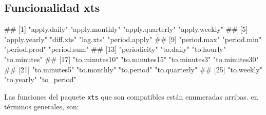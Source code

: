 \documentclass[
]{book}
\newenvironment{Shaded}{\begin{snugshade}}{\end{snugshade}}
\newcommand{\FunctionTok}[1]{\textcolor[rgb]{0.13,0.29,0.53}{\textbf{#1}}}
\newcommand{\NormalTok}[1]{#1}
\newcommand{\SpecialCharTok}[1]{\textcolor[rgb]{0.81,0.36,0.00}{\textbf{#1}}}
\begin{document}
\hypertarget{funcionalidad-xts}{%
\subsection{Funcionalidad xts}\label{funcionalidad-xts}}

\begin{Shaded}
\end{Shaded}

\begin{Shaded}
\begin{Highlighting}[]
\NormalTok{\#\#  [1] "apply.daily"     "apply.monthly"   "apply.quarterly" "apply.weekly"   }
\NormalTok{\#\#  [5] "apply.yearly"    "diff.xts"        "lag.xts"         "period.apply"   }
\NormalTok{\#\#  [9] "period.max"      "period.min"      "period.prod"     "period.sum"     }
\NormalTok{\#\# [13] "periodicity"     "to.daily"        "to.hourly"       "to.minutes"     }
\NormalTok{\#\# [17] "to.minutes10"    "to.minutes15"    "to.minutes3"     "to.minutes30"   }
\NormalTok{\#\# [21] "to.minutes5"     "to.monthly"      "to.period"       "to.quarterly"   }
\NormalTok{\#\# [25] "to.weekly"       "to.yearly"       "to\_period"}
\end{Highlighting}
\end{Shaded}

Las funciones del paquete \texttt{xts} que son compatibles están enumeradas arribas. en términos generales, son:
\end{document}
